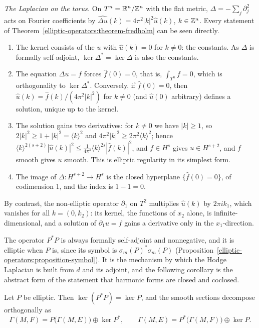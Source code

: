 \begin{example}\label{elliptic-operators:example-fredholm-torus}
\emph{The Laplacian on the torus.} On $T^n = \mathbb{R}^n/\mathbb{Z}^n$ with the flat metric, $\Delta = -\sum_j\partial_j^2$ acts on Fourier coefficients by $\widehat{\Delta u}(k) = 4\pi^2|k|^2\hat u(k)$, $k \in \mathbb{Z}^n$. Every statement of
Theorem~\ref{elliptic-operators:theorem-fredholm} can be seen directly.
\begin{enumerate}
\item The kernel consists of the $u$ with $\hat u(k) = 0$ for $k \neq 0$: the constants. As $\Delta$ is formally self-adjoint, $\ker\Delta^* = \ker\Delta$ is also the constants.
\item The equation $\Delta u = f$ forces $\hat f(0) = 0$, that is, $\int_{T^n}f = 0$, which is orthogonality to $\ker\Delta^*$. Conversely, if $\hat f(0) = 0$, then $\hat u(k) = \hat f(k)/(4\pi^2|k|^2)$ for $k \neq 0$ (and
$\hat u(0)$ arbitrary) defines a solution, unique up to the kernel.
\item The solution gains two derivatives: for $k \neq 0$ we have $|k| \geq 1$, so $2|k|^2 \geq 1 + |k|^2 = \langle k\rangle^2$ and $4\pi^2|k|^2 \geq 2\pi^2\langle k\rangle^2$; hence
$\langle k\rangle^{2(s+2)}|\hat u(k)|^2 \leq \frac{1}{4\pi^4}\langle k\rangle^{2s}|\hat f(k)|^2$, and $f \in H^s$ gives
$u \in H^{s+2}$, and $f$ smooth gives $u$ smooth. This is elliptic regularity in its simplest form.
\item The image of $\Delta \colon H^{s+2} \to H^s$ is the closed hyperplane $\{\hat f(0) = 0\}$, of codimension $1$, and the index is $1 - 1 = 0$.
\end{enumerate}
By contrast, the non-elliptic operator $\partial_1$ on $T^2$ multiplies $\hat u(k)$ by $2\pi ik_1$, which vanishes for all $k = (0, k_2)$: its kernel, the functions of $x_2$ alone, is infinite-dimensional, and a solution of
$\partial_1u = f$ gains a derivative only in the $x_1$-direction.
\end{example}

The operator $P^*P$ is always formally self-adjoint and nonnegative, and it is elliptic when $P$ is, since its symbol is $\sigma_m(P)^*\sigma_m(P)$ (Proposition~\ref{elliptic-operators:proposition-symbol}). It is the
mechanism by which the Hodge Laplacian is built from $d$ and its adjoint, and the following corollary is the abstract form of the statement that harmonic forms are closed and coclosed.

\begin{corollary}\label{elliptic-operators:corollary-p-star-p}
Let $P$ be elliptic. Then $\ker(P^*P) = \ker P$, and the smooth sections decompose orthogonally as
\[
\Gamma(M, F) = P\bigl(\Gamma(M, E)\bigr) \oplus \ker P^*, \qquad \Gamma(M, E) = P^*\bigl(\Gamma(M, F)\bigr) \oplus \ker P.
\]
\end{corollary}

